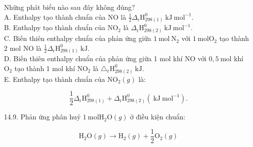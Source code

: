 \documentclass[10pt]{article}
\begin{document}
Những phát biểu nào sau đây không đúng?\\
A. Enthalpy tạo thành chuẩn của NO là $\frac{1}{2} \Delta_{\mathrm{r}} \mathrm{H}_{298(1)}^{0} \mathrm{~kJ} \mathrm{~mol}^{-1}$.\\
B. Enthalpy tạo thành chuẩn của $\mathrm{NO}_{2}$ là $\Delta_{\mathrm{r}} \mathrm{H}_{298(2)}^{0} \mathrm{~kJ} \mathrm{~mol}^{-1}$.\\
C. Biến thiên enthalpy chuẩn của phản ứng giữa $1 \mathrm{~mol} \mathrm{~N}_{2}$ với $1 \mathrm{~mol} \mathrm{O}_{2}$ tạo thành 2 mol NO là $\frac{1}{2} \Delta_{\mathrm{r}} \mathrm{H}_{298(1)}^{0} \mathrm{~kJ}$.\\
D. Biến thiên enthalpy chuẩn của phản ứng giữa 1 mol khí NO với $0,5 \mathrm{~mol}$ khí $\mathrm{O}_{2}$ tạo thành 1 mol khí $\mathrm{NO}_{2}$ là $\triangle_{\mathrm{r}} \mathrm{H}_{298(2)}^{0} \mathrm{~kJ}$.\\
E. Enthalpy tạo thành chuẩn của $\mathrm{NO}_{2}(g)$ là:

$$
\frac{1}{2} \Delta_{\mathrm{r}} \mathrm{H}_{298(1)}^{0}+\Delta_{\mathrm{r}} \mathrm{H}_{298(2)}^{0}\left(\mathrm{~kJ} \mathrm{~mol}^{-1}\right) .
$$

14.9. Phản ứng phân huỷ $1 \mathrm{~mol} \mathrm{H}_{2} \mathrm{O}(g)$ ở điều kiện chuẩn:


\begin{equation*}
\mathrm{H}_{2} \mathrm{O}(g) \rightarrow \mathrm{H}_{2}(g)+\frac{1}{2} \mathrm{O}_{2}(g) \tag{1}
\end{equation*}
\end{document}
